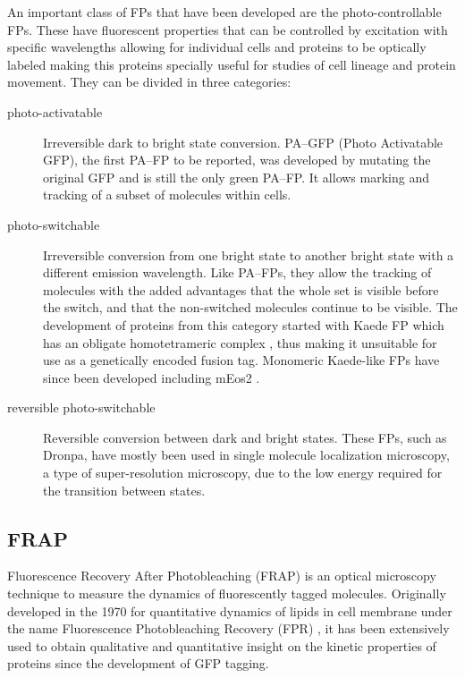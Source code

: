     An important class of FPs that have been developed are the
    photo-controllable FPs.
    These have
    fluorescent properties that can be controlled by excitation with specific
    wavelengths allowing for individual cells and proteins to be optically
    labeled making this proteins specially useful for studies of cell
    lineage and protein movement.
    They can be divided in three categories:

    \begin{description}
      \item[photo-activatable]
        Irreversible dark to bright state conversion.
        PA--GFP (Photo Activatable GFP), the first PA--FP to be
        reported, was developed by mutating the original GFP
        \citep{pagfp-discovery} and is
        still the only green PA--FP.
        It allows marking and tracking of a subset of molecules
        within cells.

      \item[photo-switchable]
        Irreversible conversion from one bright state to another bright
        state with a different emission wavelength.
        Like PA--FPs, they allow the tracking of
        molecules with the added advantages that the whole set is visible
        before the switch, and that the non-switched molecules continue
        to be visible.
        The development of proteins from this category started with Kaede FP
        which has an obligate homotetrameric
        complex \citep{kaede-discovery}, thus making it
        unsuitable for use as a genetically encoded fusion tag.
        Monomeric Kaede-like FPs have since been developed including
        mEos2 \citep{meos2-discovery}.

      \item[reversible photo-switchable]
        Reversible conversion between dark and bright states.
        These FPs, such as Dronpa, have mostly been used in
        single molecule localization
        microscopy, a type of super-resolution microscopy, due to the
        low energy required for the transition between states.

    \end{description}


  \subsection{FRAP}

    Fluorescence Recovery After Photobleaching (FRAP) is an optical
    microscopy technique to measure the dynamics of fluorescently
    tagged molecules.
    Originally developed in the 1970 for quantitative dynamics of lipids
    in cell membrane under the name Fluorescence Photobleaching
    Recovery (FPR) \citep{axelrod1976mobility}, it has
    been extensively used to obtain qualitative and quantitative
    insight on the kinetic properties of proteins since the development
    of GFP tagging.

